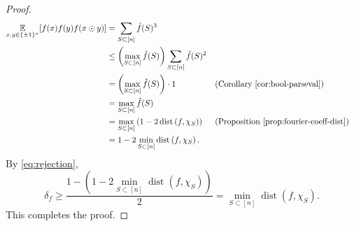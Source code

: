 \documentclass[letterpaper, reqno,11pt]{article}
\newcommand{\EE}{\mathop{{}\mathbb{E}}}
\DeclareMathOperator{\dist}{dist}
\begin{document}
\begin{proof}
  \begin{align*}
    \EE_{x, y \in \{ \pm 1 \}^n}[f(x) f(y) f(x \odot y)] &= \sum_{S \subset [n]} \hat{f}(S)^3 \\
    &\leq \left(\max_{S \subset [n]} \hat{f}(S)\right) \sum_{S \subset [n]} \hat{f}(S)^2 \\
    &= \left(\max_{S \subset [n]} \hat{f}(S)\right) \cdot 1 && \text{(Corollary \ref{cor:bool-parseval})} \\
    &= \max_{S \subset [n]} \hat{f}(S) \\
    &= \max_{S \subset [n]} \left(1 - 2\dist\left(f, \chi_S\right)\right) && \text{(Proposition \ref{prop:fourier-coeff-dist})} \\
    &= 1 - 2\min_{S \subset [n]} \dist\left(f, \chi_S\right).
  \end{align*}
  By \eqref{eq:rejection},
  $$ \delta_f \geq \frac{1 - \left(1 - 2\min_{S \subset [n]} \dist\left(f, \chi_S\right)\right)}{2} = \min_{S \subset [n]} \dist\left(f, \chi_S\right). $$
  This completes the proof.
\end{proof}
\end{document}
